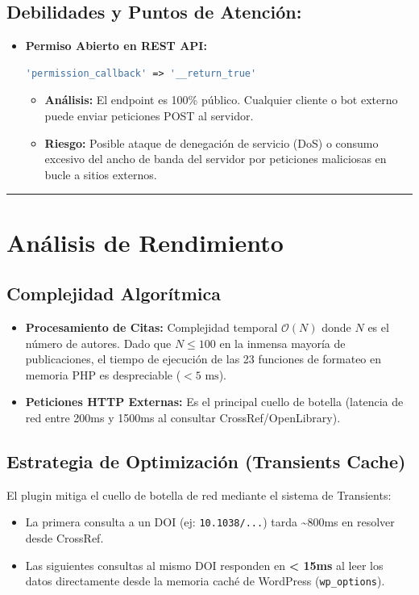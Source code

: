 \documentclass[11pt, a4paper]{article}
\begin{document}
\subsection{Debilidades y Puntos de Atención:}
\begin{itemize}
\item \textbf{Permiso Abierto en REST API:}
\begin{lstlisting}[language=PHP]
  'permission_callback' => '__return_true'
\end{lstlisting}
\begin{itemize}
\item \textbf{Análisis:} El endpoint es 100\% público. Cualquier cliente o bot externo puede enviar peticiones POST al servidor.
\item \textbf{Riesgo:} Posible ataque de denegación de servicio (DoS) o consumo excesivo del ancho de banda del servidor por peticiones maliciosas en bucle a sitios externos.
\end{itemize}
\end{itemize}

\bigskip\noindent\rule{\textwidth}{0.4pt}\bigskip


\section{Análisis de Rendimiento}

\subsection{Complejidad Algorítmica}
\begin{itemize}
\item \textbf{Procesamiento de Citas:} Complejidad temporal $\mathcal{O}(N)$ donde $N$ es el número de autores. Dado que $N \le 100$ en la inmensa mayoría de publicaciones, el tiempo de ejecución de las 23 funciones de formateo en memoria PHP es despreciable ($< 5\text{ ms}$).
\item \textbf{Peticiones HTTP Externas:} Es el principal cuello de botella (latencia de red entre 200ms y 1500ms al consultar CrossRef/OpenLibrary).
\end{itemize}
\subsection{Estrategia de Optimización (Transients Cache)}
El plugin mitiga el cuello de botella de red mediante el sistema de Transients:

\begin{itemize}
\item La primera consulta a un DOI (ej: \texttt{10.1038/...}) tarda \textasciitilde{}800ms en resolver desde CrossRef.
\item Las siguientes consultas al mismo DOI responden en \textbf{< 15ms} al leer los datos directamente desde la memoria caché de WordPress (\texttt{wp\_options}).
\end{itemize}
\end{document}
